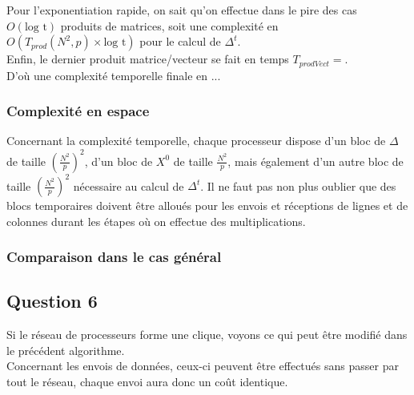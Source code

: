 \documentclass{article}
\begin{document}

Pour l'exponentiation rapide, on sait qu'on effectue dans le pire des cas $O(\text{log t})$ produits de matrices, soit une complexité en $O(T_{prod}(N^2,p)\times \text{log t})$ pour le calcul de $\Delta^t$. \\ %

Enfin, le dernier produit matrice/vecteur se fait en temps $T_{prodVect} = $. \\ %

D'où une complexité temporelle finale en ... %

\subsubsection*{Complexité en espace}

Concernant la complexité temporelle, chaque processeur dispose d'un bloc de $\Delta$ de taille $\left(\frac{N^2}{p}\right)^2$, d'un bloc de $X^0$ de taille $\frac{N^2}{p}$, mais également d'un autre bloc de taille $\left(\frac{N^2}{p}\right)^2$ nécessaire au calcul de $\Delta^t$. Il ne faut pas non plus oublier que des blocs temporaires doivent être alloués pour les envois et réceptions de lignes et de colonnes durant les étapes où on effectue des multiplications. %

\subsubsection*{Comparaison dans le cas général} 


\subsection*{Question 6}

Si le réseau de processeurs forme une clique, voyons ce qui peut être modifié dans le précédent algorithme. \\

Concernant les envois de données, ceux-ci peuvent être effectués sans passer par tout le réseau, chaque envoi aura donc un coût identique. \\
\end{document}
